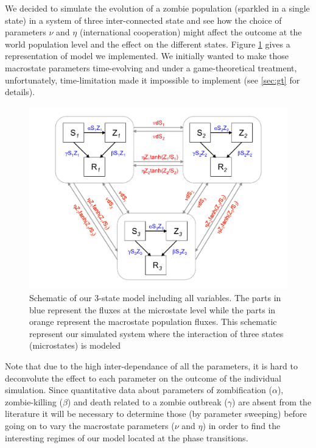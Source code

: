 \documentclass[11pt]{article} %
\begin{document}
We decided to simulate the evolution of a zombie population (sparkled in a single state) in a system of three inter-connected state and see how the choice of parameters $\nu$ and $\eta$ (international cooperation) might affect the outcome at the world population level and the effect on the different states. Figure \ref{totalmodel} gives a representation of model we implemented. We initially wanted to make those macrostate parameters time-evolving and under a game-theoretical treatment, unfortunately, time-limitation made it impossible to implement (see \ref{sec:gt} for details). 
\begin{figure}[h!]
\centerline{
\includegraphics[scale=0.45]{../images/Powerpoint_figures/total_model.pdf}}
\caption{Schematic of our 3-state model including all variables. The parts in blue represent the fluxes at the microstate level while the parts in orange represent the macrostate population fluxes. This schematic represent our simulated system where the interaction of three states (microstates) is modeled \label{totalmodel} }
\end{figure}


Note that due to the high inter-dependance of all the parameters, it is hard to deconvolute the effect to each parameter on the outcome of the individual simulation. Since quantitative data about parameters of zombification ($\alpha$), zombie-killing ($\beta$) and death related to a zombie outbreak ($\gamma$) are absent from the literature it will be necessary to determine those (by parameter sweeping) before going on to vary the macrostate parameters ($\nu$ and $\eta$) in order to find the interesting regimes of our model located at the phase transitions. 
\end{document}
